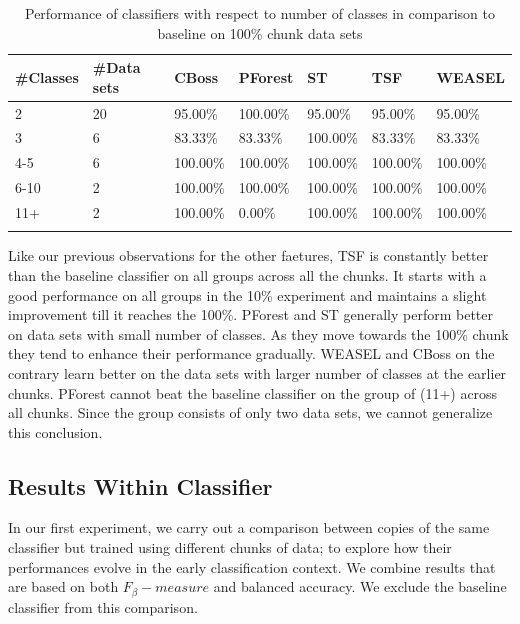 \begin{table}[hbt!]
	\setlength\extrarowheight{2pt} %
	\begin{tabularx}{\textwidth}{|X|X|X|X|X|X|X|}
	\hline
	\textbf{\#Classes} & \textbf{\#Data sets} & \textbf{CBoss} & \textbf{PForest} & \textbf{ST} & \textbf{TSF} & \textbf{WEASEL} \\ \hline
		2 & 20 & 95.00\% & 100.00\% & 95.00\% & 95.00\% & 95.00\% \\ \hline
		3 & 6 & 83.33\% & 83.33\% & 100.00\% & 83.33\% & 83.33\% \\ \hline
		4-5 & 6 & 100.00\% & 100.00\% & 100.00\% & 100.00\% & 100.00\% \\ \hline
		6-10 & 2 & 100.00\% & 100.00\% & 100.00\% & 100.00\% & 100.00\% \\ \hline
		11+ & 2 & 100.00\% & 0.00\% & 100.00\% & 100.00\% & 100.00\% \\ \hline
  \caption{Performance of classifiers with respect to number of classes in comparison to baseline on 100\% chunk data sets}
  \label{TableNumClass100}
  \end{tabularx}
\end{table}

Like our previous observations for the other faetures, TSF is constantly better than the baseline classifier on all groups across all the chunks.
It starts with a good performance on all groups in the 10\% experiment and maintains a slight improvement till it reaches the 100\%.
PForest and ST generally perform better on data sets with small number of classes. As they move towards the 100\% chunk they tend to enhance their performance gradually.
WEASEL and CBoss on the contrary learn better on the data sets with larger number of classes at the earlier chunks.
PForest cannot beat the baseline classifier on the group of (11+) across all chunks. Since the group consists of only two data sets, we cannot generalize this conclusion.


\subsection{Results Within Classifier}
\label{SubsectionWithinComparison}
In our first experiment, we carry out a comparison between copies of the same classifier but trained using different chunks of data;
to explore how their performances evolve in the early classification context. We combine results that are based on both $F_{\beta}-measure$ and balanced accuracy.
We exclude the baseline classifier from this comparison.


